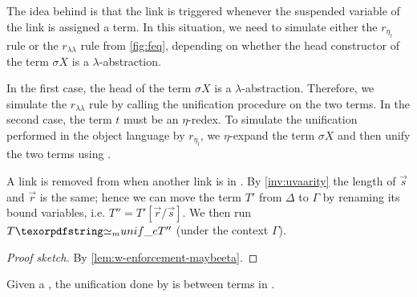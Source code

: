 The idea behind \progressetaleft is that the link is triggered whenever the
suspended variable of the \maybeeta link is assigned a term. In this
situation, we need to simulate either the $r_{\eta_l}$ rule or the
$r_{\lambda\lambda}$ rule from \cref{fig:feq}, depending on whether the head
constructor of the term $\sigma X$ is a $\lambda$-abstraction.

In the first case, the head of the term $\sigma X$ is a $\lambda$-abstraction.
Therefore, we simulate the $r_{\lambda\lambda}$ rule by calling the unification
procedure on the two terms. In the second case, the term $t$ must be an
$\eta$-redex. To simulate the unification performed in the object language by
$r_{\eta_l}$, we $\eta$-expand the term $\sigma X$ and then unify the two terms
using \Ue.



\newcommand{\progressetadedup}{\emph{$\eta$-progress-deduplicate}\xspace}
\begin{definition}[\progressetadedup]\label{def:progressetadedup}
  A link  is removed from \linkStore when
  another link  is in  \linkStore.
  By \cref{inv:uvaarity} the length of $\vec{s}$ and $\vec{r}$ is the same;
  hence we can move the term $T'$ from $\Delta$ to $\Gamma$ by renaming its
  bound variables, i.e. $T'' = T'[\vec{r}/\vec{s}]$.
  We then run $T \Ue{} T''$ (under the context $\Gamma$).
\end{definition}


\begin{proof}[Proof sketch]
  By \cref{lem:w-enforcement-maybeeta}.
\end{proof}

\begin{lemma} \label{lemma:unif-eta-1}
  Given a \linketa {}, the unification done by \progressetaleft is between
  terms in \wellb.
\end{lemma}

